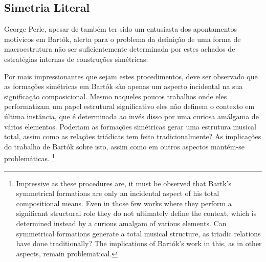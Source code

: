 \documentclass[
	12pt,				%
	openright,			%
	twoside,			%
	a4paper,			%
	english,			%
	french,				%
	spanish,			%
	brazil				%
	]{abntex2}
\begin{document}
%



\subsection{Simetria Literal}
\label{simetrialiteral}


George Perle, apesar de também ter sido um entusiasta dos apontamentos motívicos em Bartók, alerta para o problema da definição de uma forma de macroestrutura não ser suficientemente determinada por estes achados de estratégias internas de construções simétricas:

\begin{citacao}
Por mais impressionantes que sejam estes procedimentos, deve ser observado que as formações simétricas em Bartók são apenas um aspecto incidental na sua significação composicional. Mesmo naqueles poucos trabalhos onde eles performatizam um papel estrutural significativo eles não definem o contexto em última instância, que é determinada ao invés disso por uma curiosa amálgama de vários elementos.
Poderiam as formações simétricas gerar uma estrutura musical total, assim como as relações triádicas tem feito tradicionalmente? As implicações do trabalho de Bartók sobre isto, assim como em outros aspectos mantém-se problemáticas.\cite[ p.300-312]{perle1955symmetrical} \footnote{Impressive as these procedures are, it must be observed that Bartk's symmetrical formations are only an incidental aspect of his total compositional means. Even in those few works where they perform a significant structural role they do not ultimately define the context, which is determined instead by a curious amalgam of various elements. Can symmetrical formations generate a total musical structure, as triadic relations have done traditionally? The implications of Bartók's work in this, as in other aspects, remain problematical.\cite[ p.300-312]{perle1955symmetrical}}
\end{citacao}
\end{document}
